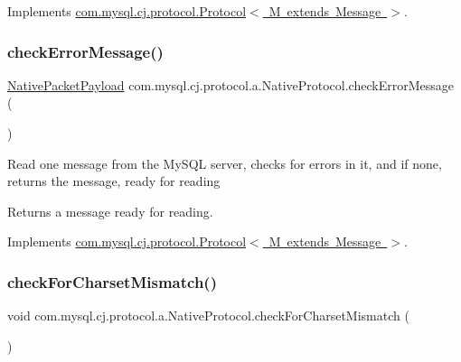 Implements \mbox{\hyperlink{interfacecom_1_1mysql_1_1cj_1_1protocol_1_1_protocol_ae7c8eae149543f5b736a905864b8c1f2}{com.\+mysql.\+cj.\+protocol.\+Protocol$<$ M extends Message $>$}}.

\mbox{\label{classcom_1_1mysql_1_1cj_1_1protocol_1_1a_1_1_native_protocol_a7c2558549dd31879ef27e087724c3c44}} 
\subsubsection{\texorpdfstring{check\+Error\+Message()}{checkErrorMessage()}}
{\footnotesize\ttfamily \mbox{\hyperlink{classcom_1_1mysql_1_1cj_1_1protocol_1_1a_1_1_native_packet_payload}{Native\+Packet\+Payload}} com.\+mysql.\+cj.\+protocol.\+a.\+Native\+Protocol.\+check\+Error\+Message (\begin{DoxyParamCaption}{ }\end{DoxyParamCaption})}

Read one message from the My\+S\+QL server, checks for errors in it, and if none, returns the message, ready for reading

\begin{DoxyReturn}{Returns}
a message ready for reading. 
\end{DoxyReturn}


Implements \mbox{\hyperlink{interfacecom_1_1mysql_1_1cj_1_1protocol_1_1_protocol_a7176330712bc7aa3ba67261d4a8ef0ca}{com.\+mysql.\+cj.\+protocol.\+Protocol$<$ M extends Message $>$}}.

\mbox{\label{classcom_1_1mysql_1_1cj_1_1protocol_1_1a_1_1_native_protocol_a08c79e079662813e512c6fe30cfb5fdd}} 
\subsubsection{\texorpdfstring{check\+For\+Charset\+Mismatch()}{checkForCharsetMismatch()}}
{\footnotesize\ttfamily void com.\+mysql.\+cj.\+protocol.\+a.\+Native\+Protocol.\+check\+For\+Charset\+Mismatch (\begin{DoxyParamCaption}{ }\end{DoxyParamCaption})}

